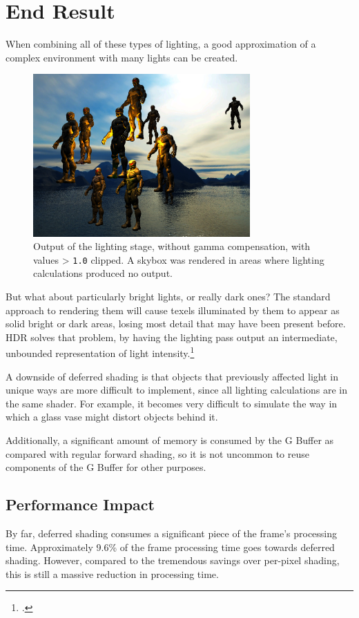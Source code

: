\documentclass[11pt, oneside]{report}
\begin{document}
\section{End Result}
When combining all of these types of lighting, a good approximation of a complex environment with many lights can be created.

\begin{figure}[!htbp]
   \centering
   \includegraphics[width=0.74\textwidth]{images/lighting_out.png}
   \caption{Output of the lighting stage, without gamma compensation, with values > \texttt{1.0} clipped. A \gls{skybox} was rendered in areas where lighting calculations produced no output.}
   \label{fig:f14}
\end{figure}

But what about particularly bright lights, or really dark ones? The standard approach to rendering them will cause \glspl{texel} illuminated by them to appear as solid bright or dark areas, losing most detail that may have been present before. \gls{HDR} solves that problem, by having the lighting pass output an intermediate, unbounded representation of light intensity.\footcite{trebilco-deferred}

A downside of deferred shading is that objects that previously affected light in unique ways are more difficult to implement, since all lighting calculations are in the same shader. For example, it becomes very difficult to simulate the way in which a glass vase might distort objects behind it.

Additionally, a significant amount of memory is consumed by the \gls{G Buffer} as compared with regular \gls{forward shading}, so it is not uncommon to reuse components of the \gls{G Buffer} for other purposes.

\subsection{Performance Impact}
By far, deferred shading consumes a significant piece of the frame's processing time. Approximately 9.6\% of the frame processing time goes towards deferred shading. However, compared to the tremendous savings over per-pixel shading, this is still a massive reduction in processing time.
\end{document}
